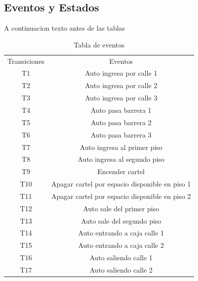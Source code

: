 \documentclass{article}
\begin{document}
	\subsection{Eventos y Estados}
	A continuacion texto antes de las tablas
	\begin{table}[H]
		\begin{center}
		\begin{tabular}{ |c|c| } 
 			\hline
 			Transiciones & Eventos \\ 
 			T1 & Auto ingresa por calle 1 \\
 			T2 & Auto ingresa por calle 2 \\
 			T3 & Auto ingresa por calle 3 \\
 			T4 & Auto pasa barrera 1 \\
 			T5 & Auto pasa barrera 2 \\
 			T6 & Auto pasa barrera 3 \\ 
 			T7 & Auto ingresa al primer piso \\
 			T8 & Auto ingresa al segundo piso \\
 			T9 & Encender cartel \\
 			T10 & Apagar cartel por espacio disponible en piso 1 \\
 			T11 & Apagar cartel por espacio disponible en piso 2 \\
 			T12 & Auto sale del primer piso \\
 			T13 & Auto sale del segundo piso \\
 			T14 & Auto entrando a caja calle 1 \\
 			T15 & Auto entrando a caja calle 2 \\
 			T16 & Auto saliendo calle 1\\
 			T17 & Auto saliendo calle 2 \\ 
 			\hline
		\end{tabular}
		\end{center}
		\caption{Tabla de eventos}
		\label{table:eventos}
	\end{table}
	
\end{document}
